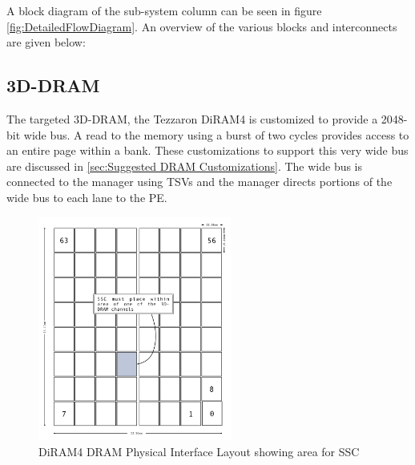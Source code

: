 \documentclass[journal]{IEEEtran}
\begin{document}
\bigskip
A block diagram of the sub-system column can be seen in figure \ref{fig:DetailedFlowDiagram}. 
An overview of the various blocks and interconnects are given below:

\subsection{3D-DRAM}
The targeted 3D-DRAM, the Tezzaron DiRAM4 is customized to provide a 2048-bit wide bus. A read to the memory using a burst of two cycles provides access to an entire page within a bank.
These customizations to support this very wide bus are discussed in \ref{sec:Suggested DRAM Customizations}.
The wide bus is connected to the manager using TSVs and the manager directs portions of the wide bus to each lane to the PE.
\begin{figure}[!t]
\captionsetup{width=.9\linewidth}
\centerline{
\mbox{\includegraphics[width=2.5in]{DiRAM4Layout.jpg}}
}
\caption{DiRAM4 DRAM Physical Interface Layout\cite{tezzaron:diram4}\cite{patti2014} showing area for SSC }
\label{fig:diram4Layout}
\end{figure}


\end{document}
